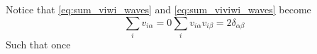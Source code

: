 Notice that \ref{eq:sum_viwi_waves} and \ref{eq:sum_viviwi_waves} become
\begin{subequations}
\begin{equation}\label{eq:sum_viwi_waves}
    \sum_i v_{i\alpha}= 0
\end{equation}
\begin{equation}\label{eq:sum_viviwi_waves}
    \sum_i v_{i\alpha}v_{i\beta} = 2\delta_{\alpha\beta}
\end{equation}
\end{subequations}
Such that once 
